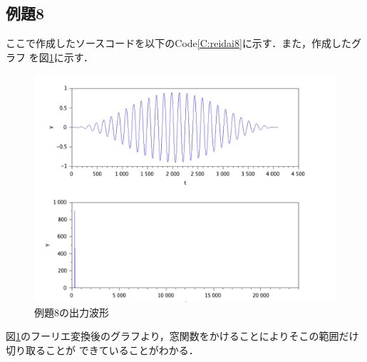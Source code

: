 \documentclass[a4paper,11pt]{jsarticle}
\begin{document}
  \subsection{例題8}
  ここで作成したソースコードを以下のCode\ref{C:reidai8}に示す．また，作成したグラフ
  を図\ref{G:reidai8}に示す．
  
  \begin{figure}[H]
    \centering
    \includegraphics[width=0.8\linewidth]{picture/reidai8.png}
    \caption{例題8の出力波形}
    \label{G:reidai8}
  \end{figure}
  図\ref{G:reidai8}のフーリエ変換後のグラフより，窓関数をかけることによりそこの範囲だけ切り取ることが
  できていることがわかる．
\end{document}
